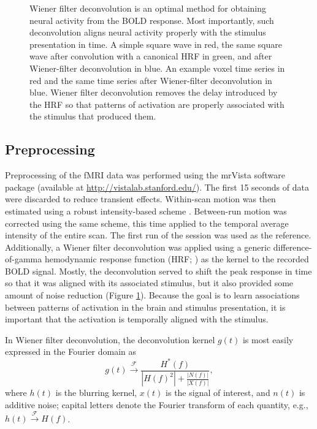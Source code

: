 \documentclass[5p,authoryear]{elsarticle}
\begin{document}
\begin{figure}
\begin{subfigure}{0.4\textwidth}
\caption{}
\label{fig:wiener-voxel}
\end{subfigure}
\caption{
Wiener filter deconvolution is an optimal method for obtaining neural activity from the BOLD response.
Most importantly, such deconvolution aligns neural activity properly with the stimulus presentation in time.
 A simple square wave in red, the same square wave after convolution with a canonical HRF in green, and after Wiener-filter deconvolution in blue. 
 An example voxel time series in red and the same time series after Wiener-filter deconvolution in blue.
Wiener filter deconvolution removes the delay introduced by the HRF so that patterns of activation are properly associated with the stimulus that produced them.}
\label{fig:wiener-deconvolution}
\end{figure}

\subsection{Preprocessing}
Preprocessing of the fMRI data was performed using the mrVista software package (available at \url{http://vistalab.stanford.edu/}). 
The first 15 seconds of data  were discarded to reduce transient effects.
Within-scan motion was then estimated using a robust intensity-based scheme \citep{Nestares2000}. 
Between-run motion was corrected using the same scheme, this time applied to the temporal average intensity of the entire scan. 
The first run of the session was used as the reference. 
Additionally, a Wiener filter deconvolution \citep{Poor1980} was applied using a generic difference-of-gamma hemodynamic response function (HRF; \cite{Glover1999}) as the kernel to the recorded BOLD signal.
Mostly, the deconvolution served to shift the peak response in time so that it was aligned with its associated stimulus, but it also provided some amount of noise reduction (Figure \ref{fig:wiener-voxel}).
Because the goal is to learn associations between patterns of activation in the brain and stimulus presentation, it is important that the activation is temporally aligned with the stimulus.

In Wiener filter deconvolution, the deconvolution kernel $g(t)$ is most easily expressed in the Fourier domain as
\begin{equation}
g(t) \xrightarrow{\mathcal{F}} \frac{H^{*}(f)}{\left|H(f)^{2}\right| + \frac{\left| N(f) \right|}{\left| X(f) \right|}},
\end{equation}
where $h(t)$ is the blurring kernel, $x(t)$ is the signal of interest, and $n(t)$ is additive noise; capital letters denote the Fourier transform of each quantity, e.g., $h(t) \xrightarrow{\mathcal{F}} H(f)$.
\end{document}
